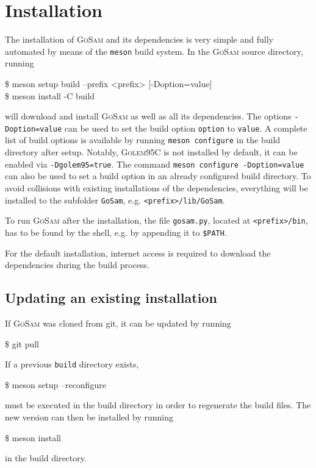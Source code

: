 \documentclass[11pt,a4paper]{refrep}
\newcommand{\gosam}{\textsc{GoSam}\xspace}
\newcommand{\golemVC}{\textsc{Golem95C}\xspace}
\begin{document}
\section{Installation}

The installation of \gosam and its dependencies is very simple and fully automated by means of the \texttt{meson}
build system. In the \gosam source directory, running
\begin{example}
\$ meson setup build --prefix <prefix> [-Doption=value] \\
\$ meson install -C build
\end{example}
will download and install \gosam as well as all its dependencies. The options {\tt -Doption=value} can
be used to set the build option {\tt option} to {\tt value}. A complete list of build options is available by
running {\tt meson configure} in the build directory after
setup. Notably, \golemVC is not installed by default, it can be
enabled via \texttt{-Dgolem95=true}. The command {\tt meson configure -Doption=value} can also
be used to set a build option in an already configured build directory. To avoid collisions with existing
installations of the dependencies, everything will be installed to the subfolder {\tt GoSam},
e.g. {\tt <prefix>/lib/GoSam}.

To run \gosam after the installation, the file \texttt{gosam.py}, located at \texttt{<prefix>/bin}, has to be found by the shell, e.g. by appending it to \texttt{\$PATH}.

For the default installation, internet access is required to download the dependencies during the build process.

\subsection{Updating an existing installation}

If \gosam was cloned from git, it can be updated by running
\begin{example}
\$ git pull
\end{example}
If a previous \texttt{build} directory exists, 
\begin{example}
\$ meson setup --reconfigure
\end{example}
must be executed in the build directory in order to regenerate the build files. The new version can then be installed by running
\begin{example}
\$ meson install
\end{example}
in the build directory.
\end{document}
